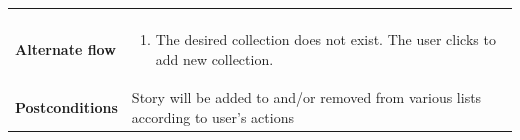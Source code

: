 \begin{table}[htp]
\begin{tabular}[b]{|l | l|}
\begin{minipage}{5in}
		\end{minipage}						\\\hline&\\[-2ex]
		\textbf{Alternate flow}		& \begin{minipage}{5in}
			\begin{enumerate}[noitemsep]
				\item The desired collection does not exist. The user clicks to add new collection.
			\end{enumerate}
		\end{minipage}							\\\hline
		\textbf{Postconditions}		& Story will be added to and/or removed from various lists according to user's actions\\\hline
	\end{tabular}
\end{table}

